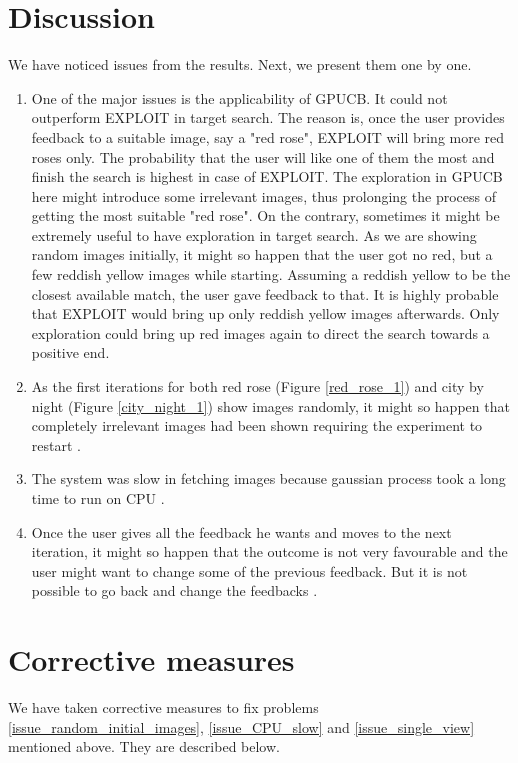\documentclass[english]{tktltiki}
\begin{document}
\section{Discussion}

We have noticed issues from the results. Next, we present them one by one.

\begin{enumerate}
	\item One of the major issues is the applicability of GPUCB. It could not outperform EXPLOIT in target search. The reason is, once the user provides feedback to a suitable image, say a "red rose", EXPLOIT will bring more red roses only. The probability that the user will like one of them the most and finish the search is highest in case of EXPLOIT. The exploration in GPUCB here might introduce some irrelevant images, thus prolonging the process of getting the most suitable "red rose". On the contrary, sometimes it might be extremely useful to have exploration in target search. As we are showing random images initially, it might so happen that the user got no red, but a few reddish yellow images while starting. Assuming a reddish yellow to be the closest available match, the user gave feedback to that. It is highly probable that EXPLOIT would bring up only reddish yellow images afterwards. Only exploration could bring up red images again to direct the search towards a positive end.
	\item As the first iterations for both red rose (Figure \ref{red_rose_1}) and city by night (Figure \ref{city_night_1}) show images randomly, it might so happen that completely irrelevant images had been shown requiring the experiment to restart \label{issue_random_initial_images}.
	\item The system was slow in fetching images because gaussian process took a long time to run on CPU \label{issue_CPU_slow}.
	\item Once the user gives all the feedback he wants and moves to the next iteration, it might so happen that the outcome is not very favourable and the user might want to change some of the previous feedback. But it is not possible to go back and change the feedbacks \label{issue_single_view}.
\end{enumerate}


\section{Corrective measures}

We have taken corrective measures to fix problems \ref{issue_random_initial_images}, \ref{issue_CPU_slow} and \ref{issue_single_view} mentioned above. They are described below.
\end{document}
